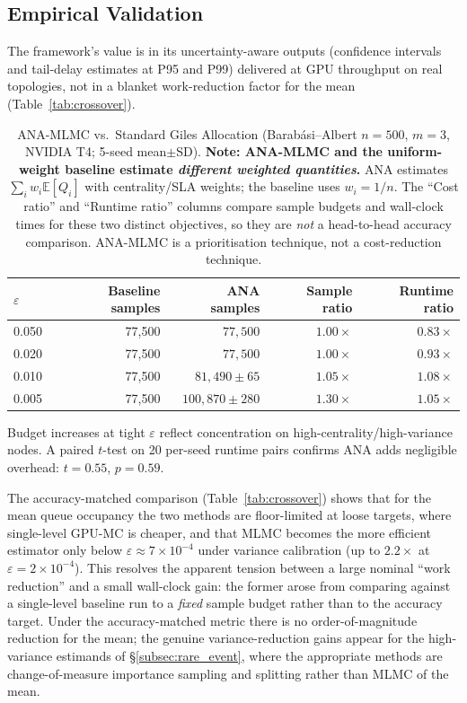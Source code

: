 \documentclass{ieeeaccess}
\begin{document}
\subsection{Empirical Validation}

The framework's value is in its uncertainty-aware outputs (confidence intervals and tail-delay
estimates at P95 and P99) delivered at GPU throughput on real topologies, not in a blanket
work-reduction factor for the mean (Table~\ref{tab:crossover}).

\begin{table}[!t]
\caption{ANA-MLMC vs.\ Standard Giles Allocation
(Barab\'{a}si--Albert $n=500$, $m=3$, NVIDIA T4; 5-seed mean$\pm$SD).
\textbf{Note: ANA-MLMC and the uniform-weight baseline estimate \emph{different weighted
quantities}.} ANA estimates $\sum_i w_i\mathbb{E}[Q_i]$ with centrality/SLA weights; the
baseline uses $w_i{=}1/n$. The ``Cost ratio'' and ``Runtime ratio'' columns compare sample
budgets and wall-clock times for these two distinct objectives, so they are \emph{not}
a head-to-head accuracy comparison. ANA-MLMC is a prioritisation technique, not a
cost-reduction technique.}
\label{tab:ana_mlmc}
\centering\footnotesize
\setlength{\tabcolsep}{3.5pt}
\begin{tabular}{@{}l r r r r@{}}
\toprule
$\varepsilon$ & Baseline samples & ANA samples & Sample ratio & Runtime ratio \\
\midrule
0.050 & 77{,}500 & $77{,}500$         & $1.00\times$ & $0.83\times$ \\
0.020 & 77{,}500 & $77{,}500$         & $1.00\times$ & $0.93\times$ \\
0.010 & 77{,}500 & $81{,}490\pm65$    & $1.05\times$ & $1.08\times$ \\
0.005 & 77{,}500 & $100{,}870\pm280$  & $1.30\times$ & $1.05\times$ \\
\bottomrule
\end{tabular}
\vspace{2pt}
\footnotesize Budget increases at tight $\varepsilon$ reflect concentration on
high-centrality/high-variance nodes. A paired $t$-test on 20 per-seed runtime pairs
confirms ANA adds negligible overhead: $t{=}0.55$, $p{=}0.59$.
\end{table}

The accuracy-matched comparison (Table~\ref{tab:crossover}) shows that for the mean queue
occupancy the two methods are floor-limited at loose targets, where single-level GPU-MC is
cheaper, and that MLMC becomes the more efficient estimator only below
$\varepsilon\approx7\times10^{-4}$ under variance calibration (up to $2.2\times$ at $\varepsilon{=}2\times10^{-4}$). This resolves
the apparent tension between a large nominal ``work reduction'' and a small wall-clock
gain: the former arose from comparing against a single-level baseline run to a \emph{fixed}
sample budget rather than to the accuracy target. Under the accuracy-matched metric there is no
order-of-magnitude reduction for the mean; the genuine variance-reduction gains appear for the
high-variance estimands of \S\ref{subsec:rare_event}, where the appropriate methods are
change-of-measure importance sampling and splitting rather than MLMC of the mean.
\end{document}

